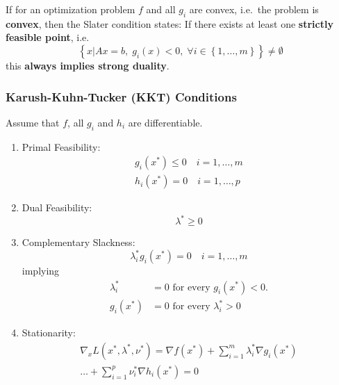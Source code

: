 If for an optimization problem $f$ and all $g_i$ are convex, i.e.\ the problem is \textbf{convex}, then the Slater condition states:
\newpar{}
If there exists at least one \textbf{strictly feasible point}, i.e.
\begin{equation*}
    \left\{x | Ax = b,\; g_i(x) < 0,\; \forall i \in \left\{1, \ldots, m\right\}\right\} \neq \emptyset
\end{equation*}
this \textbf{always implies strong duality}.

\subsubsection{Karush-Kuhn-Tucker (KKT) Conditions}

Assume that $f$, all $g_i$ and $h_i$ are differentiable.
\begin{enumerate}
    \item Primal Feasibility:
          \begin{gather*}
              g_i(x^*) \leq 0 \quad i = 1, \ldots, m \\
              h_i(x^*) = 0 \quad i = 1, \ldots, p
          \end{gather*}
    \item Dual Feasibility:
          \begin{equation*}
              \lambda^* \geq 0
          \end{equation*}
    \item Complementary Slackness:
          \begin{equation*}
              \lambda_i^*g_i(x^*)=0 \quad i = 1, \ldots, m
          \end{equation*}
          implying
          \begin{align*}
              \lambda_{i}^{*} & =0\text{ for every }g_{i}(x^{*})<0.   \\
              g_{i}(x^{*})    & =0\text{ for every }\lambda_{i}^{*}>0
          \end{align*}
    \item Stationarity:
          \begin{align*}
              \nabla_x L(x^*, \lambda^*, \nu^*) =\nabla f(x^*) +\sum_{i=1}^{m}\lambda_i^*\nabla g_i(x^*) \\
              \ldots+\sum_{i=1}^{p}\nu_i^*\nabla h_i(x^*) = 0
          \end{align*}
\end{enumerate}

\newpar{}

